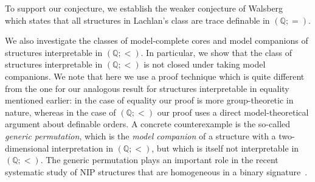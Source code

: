 \documentclass{amsart}
\theoremstyle{definition}
\theoremstyle{remark}
\numberwithin{equation}{section}
\newcommand{\pau}[1]{\textcolor{blue}{#1}}
\begin{document}

To support our conjecture, we establish the weaker conjecture of Walsberg~\cite{walsberg2026tracedefinabilityipreservation, Walsbergshort, Walsberglong} which states that all structures in Lachlan's class are trace definable in $(\mathbb{Q}; =)$. %


We also investigate the classes of model-complete cores and model companions of structures interpretable in $(\mathbb{Q}; <)$.
In particular, we show that the class of structures interpretable in $({\mathbb Q};<)$ is not closed under taking {model companions}. {We note that} here we use a proof technique which is {quite} different from the one for our analogous result for structures interpretable in equality mentioned earlier: {in the case of equality our proof is more group-theoretic in nature, whereas in the case of $({\mathbb Q};<)$ our proof uses a direct model-theoretical argument about definable orders.}
A concrete counterexample is the so-called \emph{generic permutation}, which is the \emph{model companion}
of a structure with a two-dimensional  interpretation {in} $({\mathbb Q};<)$, but which is itself not interpretable {in} $({\mathbb Q};<)$.
The generic permutation plays an important role in the recent systematic study of NIP structures that are homogeneous in a binary signature~\cite{SimonRankOne,rosy,guingona2015common}.
\end{document}
